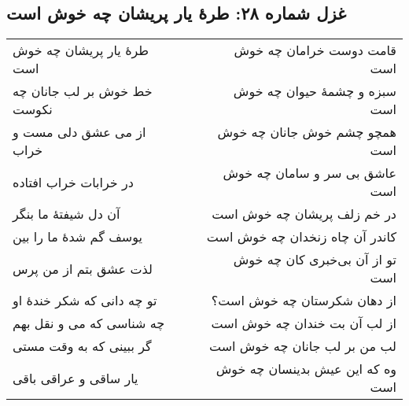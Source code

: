 \begin{center}
\section*{غزل شماره ۲۸: طرهٔ یار پریشان چه خوش است}
\label{sec:028}
\begin{longtable}{l p{0.5cm} r}
طرهٔ یار پریشان چه خوش است
&&
قامت دوست خرامان چه خوش است
\\
خط خوش بر لب جانان چه نکوست
&&
سبزه و چشمهٔ حیوان چه خوش است
\\
از می عشق دلی مست و خراب
&&
همچو چشم خوش جانان چه خوش است
\\
در خرابات خراب افتاده
&&
عاشق بی سر و سامان چه خوش است
\\
آن دل شیفتهٔ ما بنگر
&&
در خم زلف پریشان چه خوش است
\\
یوسف گم شدهٔ ما را بین
&&
کاندر آن چاه زنخدان چه خوش است
\\
لذت عشق بتم از من پرس
&&
تو از آن بی‌خبری کان چه خوش است
\\
تو چه دانی که شکر خندهٔ او
&&
از دهان شکرستان چه خوش است؟
\\
چه شناسی که می و نقل بهم
&&
از لب آن بت خندان چه خوش است
\\
گر ببینی که به وقت مستی
&&
لب من بر لب جانان چه خوش است
\\
یار ساقی و عراقی باقی
&&
وه که این عیش بدینسان چه خوش است
\\
\end{longtable}
\end{center}
